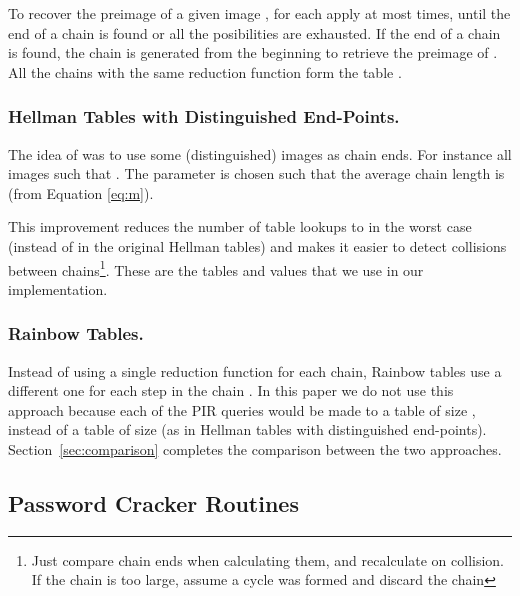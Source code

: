 \documentclass{llncs}
\begin{document}
To recover the preimage of a given image ,
for each  apply  at most  times,
until the end of a chain is found or all the posibilities are exhausted. 
If the end of a chain
is found, the chain is generated from the beginning to retrieve the
preimage of .
All the chains with the same reduction function  form the
table .


\subsubsection{Hellman Tables with Distinguished End-Points.}
\label{sub:distinguished end-points}

The idea of \cite{inbook:r-82} was
to use some (distinguished) images as chain ends. For instance all
images  such that . The parameter  is chosen such that the average
chain length is  (from Equation \ref{eq:m}). 

This improvement reduces the number of table lookups to  in the
worst case (instead of  in the original Hellman tables) and
makes it easier to detect collisions between chains\footnote{Just compare chain
ends when calculating them, and recalculate on collision. If the
chain is too large, assume a cycle was formed and discard the chain}.
These are the tables and values that we use in our implementation.


\subsubsection{Rainbow Tables.}

Instead of using a single reduction function for each chain, 
Rainbow tables use a different one for each step in the
chain \cite{paper:o-03}. In this paper we do not use this approach 
because each of the PIR queries would be made to a table of size ,
instead of a table of size  
(as in Hellman tables with distinguished end-points).
Section~\ref{sec:comparison} completes the comparison between the
two approaches.





\subsection{Password Cracker Routines}
\end{document}
